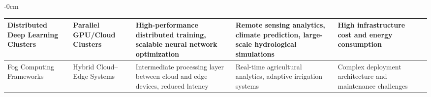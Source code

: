 \documentclass[land,review,accept,pdftex,oneauthor]{Definitions/mdpi}
\begin{document}
\begin{table}[H]
\begin{adjustwidth}{-\extralength}{0cm}
\begin{minipage}{\fulllength}
\begin{tabularx}{\textwidth}{m{2.2cm}<{\raggedright}m{2.8cm}<{\raggedright}m{3.2cm}<{\raggedright}m{3.2cm}<{\raggedright}m{3.2cm}<{\raggedright}m{1.4cm}<{\raggedright}}
Distributed Deep Learning Clusters &
Parallel GPU/Cloud Clusters &
High-performance distributed training, scalable neural network optimization &
Remote sensing analytics, climate prediction, large-scale hydrological simulations &
High infrastructure cost and energy consumption &
\citep{Dean2012,Verbraeken2020} \\
\midrule

Fog Computing Frameworks &
Hybrid Cloud--Edge Systems &
Intermediate processing layer between cloud and edge devices, reduced latency &
Real-time agricultural analytics, adaptive irrigation systems &
Complex deployment architecture and maintenance challenges &
\citep{Bonomi2012,s21175922,Guardo} \\ 



\bottomrule
\end{tabularx}
\end{minipage}
\end{adjustwidth}
\end{table}
\end{document}
